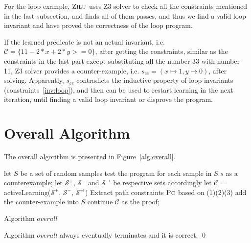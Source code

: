 For the loop example, $\textsc{Zilu}$ uses Z3 solver to check all the constraints mentioned in the last subsection,
and finds all of them passes, and thus we find a valid loop invariant and have proved the correctness of the loop program.

If the learned predicate is not an actual invariant, i.e. $\mathcal{C} = \{11-2*x+2*y>=0\}$,
after getting the constraints, similar as the constraints in the last part except substituting all the number 33 with number 11, 
Z3 solver provides a counter-example, i.e. $s_{ce} = (x \mapsto 1, y \mapsto 0)$, after solving.
Apparently, $s_{ce}$ contradicts the inductive property of loop invariants (constraints~\ref{inv:loop}), 
and then can be used to restart learning in the next iteration, until finding a valid loop invariant or disprove the program.


\section {Overall Algorithm}
\label{sec:overall}
The overall algorithm is presented in Figure~\ref{alg:overall}.
\begin{algorithm}[!h]
\SetAlgoVlined
\Indm
{}
\Indp
let $S$ be a set of random samples\;
 {
    test the program for each sample in $S$\;
     {
        \Return $s$ as a counterexample;
    }
    let $\mathcal{S}^+$, $\mathcal{S}^-$ and $\mathcal{S}^\rightarrow$ be respective sets accordingly\;
    let $\mathcal{C}$ = activeLearning($\mathcal{S}^+$, $\mathcal{S}^-$, $\mathcal{S}^\rightarrow$)\;
    Extract path constraints $\textsc{Pc}$ based on (1)(2)(3)\;
     {
         {
            add the counter-example into $S$\;
            continue\;
        }
    }
    \Return $\mathcal{C}$ as the proof;
}
\caption{Algorithm $overall$}
\label{alg:overall}
\end{algorithm}





\begin{theorem}
Algorithm $overall$ always eventually terminates and it is correct. \hfill \qed
\end{theorem}


